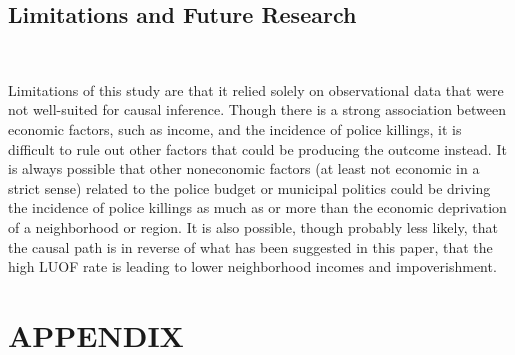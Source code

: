 \documentclass[12pt]{article}
\begin{document}
\subsection{Limitations and Future Research} \

Limitations of this study are that it relied solely on observational data that were not well-suited for causal inference. Though there is a strong association between economic factors, such as income, and the incidence of police killings, it is difficult to rule out other factors that could be producing the outcome instead. It is always possible that other noneconomic factors (at least not economic in a strict sense) related to the police budget or municipal politics could be driving the incidence of police killings as much as or more than the economic deprivation of a neighborhood or region. It is also possible, though probably less likely, that the causal path is in reverse of what has been suggested in this paper, that the high LUOF rate is leading to lower neighborhood incomes and impoverishment.
\section{APPENDIX}
\end{document}

